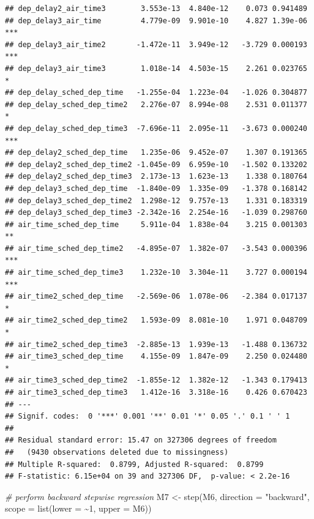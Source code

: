 \documentclass[
]{article}
\newenvironment{Shaded}{\begin{snugshade}}{\end{snugshade}}
\newcommand{\AttributeTok}[1]{\textcolor[rgb]{0.77,0.63,0.00}{#1}}
\newcommand{\CommentTok}[1]{\textcolor[rgb]{0.56,0.35,0.01}{\textit{#1}}}
\newcommand{\DecValTok}[1]{\textcolor[rgb]{0.00,0.00,0.81}{#1}}
\newcommand{\FunctionTok}[1]{\textcolor[rgb]{0.00,0.00,0.00}{#1}}
\newcommand{\NormalTok}[1]{#1}
\newcommand{\OtherTok}[1]{\textcolor[rgb]{0.56,0.35,0.01}{#1}}
\newcommand{\SpecialCharTok}[1]{\textcolor[rgb]{0.00,0.00,0.00}{#1}}
\newcommand{\StringTok}[1]{\textcolor[rgb]{0.31,0.60,0.02}{#1}}
\begin{document}
\begin{verbatim}
## dep_delay2_air_time3        3.553e-13  4.840e-12    0.073 0.941489    
## dep_delay3_air_time         4.779e-09  9.901e-10    4.827 1.39e-06 ***
## dep_delay3_air_time2       -1.472e-11  3.949e-12   -3.729 0.000193 ***
## dep_delay3_air_time3        1.018e-14  4.503e-15    2.261 0.023765 *  
## dep_delay_sched_dep_time   -1.255e-04  1.223e-04   -1.026 0.304877    
## dep_delay_sched_dep_time2   2.276e-07  8.994e-08    2.531 0.011377 *  
## dep_delay_sched_dep_time3  -7.696e-11  2.095e-11   -3.673 0.000240 ***
## dep_delay2_sched_dep_time   1.235e-06  9.452e-07    1.307 0.191365    
## dep_delay2_sched_dep_time2 -1.045e-09  6.959e-10   -1.502 0.133202    
## dep_delay2_sched_dep_time3  2.173e-13  1.623e-13    1.338 0.180764    
## dep_delay3_sched_dep_time  -1.840e-09  1.335e-09   -1.378 0.168142    
## dep_delay3_sched_dep_time2  1.298e-12  9.757e-13    1.331 0.183319    
## dep_delay3_sched_dep_time3 -2.342e-16  2.254e-16   -1.039 0.298760    
## air_time_sched_dep_time     5.911e-04  1.838e-04    3.215 0.001303 ** 
## air_time_sched_dep_time2   -4.895e-07  1.382e-07   -3.543 0.000396 ***
## air_time_sched_dep_time3    1.232e-10  3.304e-11    3.727 0.000194 ***
## air_time2_sched_dep_time   -2.569e-06  1.078e-06   -2.384 0.017137 *  
## air_time2_sched_dep_time2   1.593e-09  8.081e-10    1.971 0.048709 *  
## air_time2_sched_dep_time3  -2.885e-13  1.939e-13   -1.488 0.136732    
## air_time3_sched_dep_time    4.155e-09  1.847e-09    2.250 0.024480 *  
## air_time3_sched_dep_time2  -1.855e-12  1.382e-12   -1.343 0.179413    
## air_time3_sched_dep_time3   1.412e-16  3.318e-16    0.426 0.670423    
## ---
## Signif. codes:  0 '***' 0.001 '**' 0.01 '*' 0.05 '.' 0.1 ' ' 1
## 
## Residual standard error: 15.47 on 327306 degrees of freedom
##   (9430 observations deleted due to missingness)
## Multiple R-squared:  0.8799, Adjusted R-squared:  0.8799 
## F-statistic: 6.15e+04 on 39 and 327306 DF,  p-value: < 2.2e-16
\end{verbatim}

\begin{Shaded}
\begin{Highlighting}[]
\CommentTok{\# perform backward stepwise regression}
\NormalTok{M7 }\OtherTok{\textless{}{-}} \FunctionTok{step}\NormalTok{(M6, }\AttributeTok{direction =} \StringTok{"backward"}\NormalTok{, }\AttributeTok{scope =} \FunctionTok{list}\NormalTok{(}\AttributeTok{lower =} \SpecialCharTok{\textasciitilde{}}\DecValTok{1}\NormalTok{,}
    \AttributeTok{upper =}\NormalTok{ M6))}
\end{Highlighting}
\end{Shaded}
\end{document}
